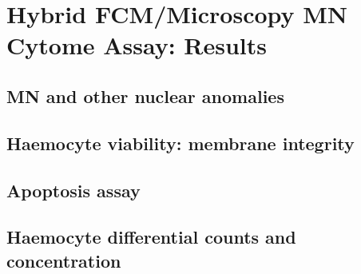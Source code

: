 \newpage
\section{Hybrid FCM/Microscopy MN Cytome Assay: Results}
\subsection{MN and other nuclear anomalies}
\subsection{Haemocyte viability: membrane integrity}
\subsection{Apoptosis assay}
\subsection{Haemocyte differential counts and concentration}

